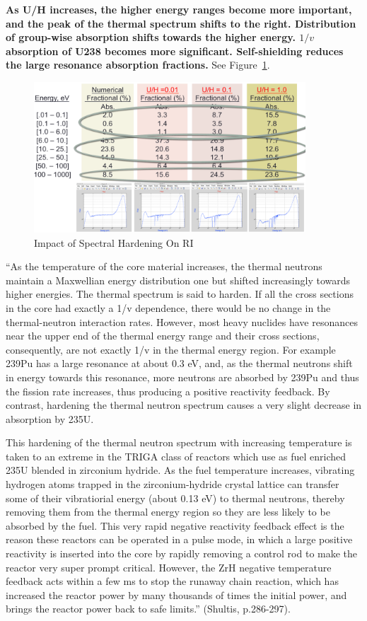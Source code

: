 \documentclass{school-22.211-notes}
\begin{document}
\clearpage
\label{spectral-hardening-section}
\textbf{As U/H increases, the higher energy ranges become more important, and the peak of the thermal spectrum shifts to the right. Distribution of group-wise absorption shifts towards the higher energy. $1/v$ absorption of U238 becomes more significant. Self-shielding reduces the large resonance absorption fractions. } See Figure~\ref{spectral-hardening}. 
\begin{figure}[ht]
  \centering
  \includegraphics[width=4in]{images/r-m/spectral-hardening.png}
  \caption{Impact of Spectral Hardening On RI} \label{spectral-hardening}
\end{figure}

``As the temperature of the core material increases, the thermal neutrons maintain a Maxwellian energy distribution one but shifted increasingly towards higher energies. The thermal spectrum is said to harden. If all the cross sections in the core
had exactly a 1/v dependence, there would be no change in the thermal-neutron
interaction rates. However, most heavy nuclides have resonances near the upper end
of the thermal energy range and their cross sections, consequently, are not exactly
1/v in the thermal energy region. For example 239Pu has a large resonance at about 0.3 eV, and, as the thermal neutrons shift in energy towards this resonance, more neutrons are absorbed by 239Pu and thus the fission rate increases, thus producing a positive reactivity feedback. By contrast, hardening the thermal neutron spectrum causes a very slight decrease in absorption by 235U. 

This hardening of the thermal neutron spectrum with increasing temperature
is taken to an extreme in the TRIGA class of reactors which use as fuel enriched 235U blended in zirconium hydride. As the fuel temperature increases, vibrating hydrogen atoms trapped in the zirconium-hydride crystal lattice can transfer some
of their vibratiorial energy (about 0.13 eV) to thermal neutrons, thereby removing
them from the thermal energy region so they are less likely to be absorbed by the
fuel. This very rapid negative reactivity feedback effect is the reason these reactors
can be operated in a pulse mode, in which a large positive reactivity is inserted into
the core by rapidly removing a control rod to make the reactor very super prompt
critical. However, the ZrH negative temperature feedback acts within a few ms to
stop the runaway chain reaction, which has increased the reactor power by many
thousands of times the initial power, and brings the reactor power back to safe
limits.'' (Shultis, p.286-297). 
\end{document}
